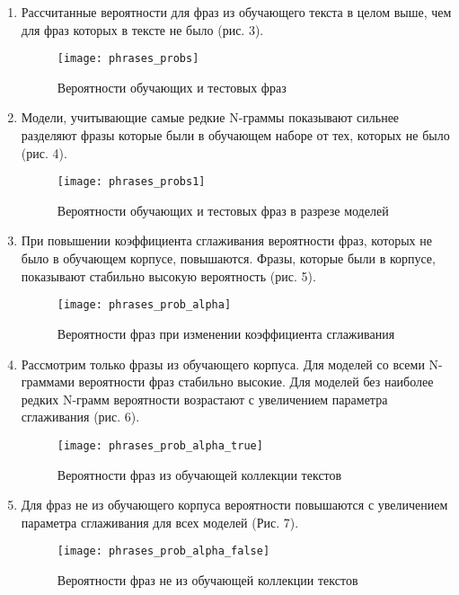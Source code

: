 \documentclass[a4paper,12pt]{article}
\begin{document}
\begin{enumerate}
\item Рассчитанные вероятности для фраз из обучающего текста в целом выше, чем для фраз которых в тексте не было (рис. 3).

\begin{figure}[H]
\caption{Вероятности обучающих и тестовых фраз}
\centering
\texttt{[image: phrases\_probs]}
\end{figure}

\item Модели, учитывающие самые редкие N-граммы показывают сильнее разделяют фразы которые были в обучающем наборе от тех, которых не было (рис. 4).
\begin{figure}[H]
\caption{Вероятности обучающих и тестовых фраз в разрезе моделей}
\centering
\texttt{[image: phrases\_probs1]}
\end{figure}

\item При повышении коэффициента сглаживания вероятности фраз, которых не было в обучающем корпусе, повышаются. Фразы, которые были в корпусе, показывают стабильно высокую вероятность (рис. 5).
\begin{figure}[H]
\caption{Вероятности фраз при изменении коэффициента сглаживания}
\centering
\texttt{[image: phrases\_prob\_alpha]}
\end{figure}

\item Рассмотрим только фразы из обучающего корпуса. Для моделей со всеми N-граммами вероятности фраз стабильно высокие. Для моделей без наиболее редких N-грамм вероятности возрастают с увеличением параметра сглаживания (рис. 6).
\begin{figure}[H]
\caption{Вероятности фраз из обучающей коллекции текстов}
\centering
\texttt{[image: phrases\_prob\_alpha\_true]}
\end{figure}

\item Для фраз не из обучающего корпуса вероятности повышаются с увеличением параметра сглаживания для всех моделей (Рис. 7).
\begin{figure}[H]
\caption{Вероятности фраз не из обучающей коллекции текстов}
\centering
\texttt{[image: phrases\_prob\_alpha\_false]}
\end{figure}

\end{enumerate}
\end{document}
